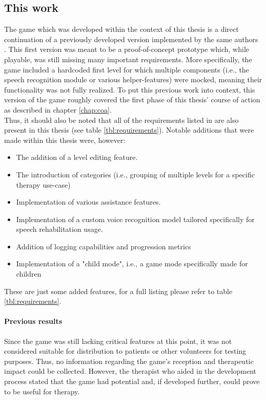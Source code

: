 \documentclass[draft,final]{vutinfth} %
\begin{document}
\subsection{This work}
The game which was developed within the context of this thesis is a direct continuation of a previously developed version implemented by the same authors \cite{LEPaper}. This first version was meant to be a proof-of-concept prototype which,  while playable, was still missing many important requirements. More specifically, the game included a hardcoded first level for which multiple components (i.e., the speech recognition module or various helper-features) were mocked, meaning their functionality was not fully realized. To put this previous work into context, this version of the game roughly covered the first phase of this thesis' course of action as described in chapter \ref{chap:coa}. \\
Thus, it should also be noted that all of the requirements listed in \cite{LEPaper} are also present in this thesis (see table \ref{tbl:requirements}). Notable additions that were made within this thesis were, however: 
\begin{itemize}
\item The addition of a level editing feature.
\item The introduction of categories (i.e., grouping of multiple levels for a specific therapy use-case)
\item Implementation of various assistance features.
\item Implementation of a custom voice recognition model tailored specifically for speech rehabilitation usage.
\item Addition of logging capabilities and progression metrics
\item Implementation of a "child mode", i.e., a game mode specifically made for children
\end{itemize}
These are just some added features, for a full listing please refer to table \ref{tbl:requirements}.

\paragraph{Previous results}
Since the game was still lacking critical features at this point, it was not considered suitable for distribution to patients or other volunteers for testing purposes. Thus, no information regarding the game's reception and therapeutic impact could be collected. However, the therapist who aided in the development process stated that the game had potential and, if developed further, could prove to be useful for therapy.
\end{document}
